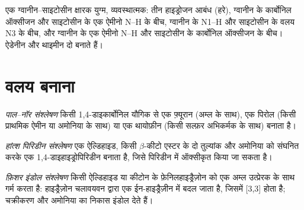\begin{omfigure}

{\small एक ग्वानीन--साइटोसीन क्षारक युग्म, व्यवस्थात्मक: तीन हाइड्रोजन आबंध (हरे),
ग्वानीन के कार्बोनिल ऑक्सीजन और साइटोसीन के एक ऐमीनो N--H के बीच, ग्वानीन के N1--H
और साइटोसीन के वलय N3 के बीच, और ग्वानीन के एक ऐमीनो N--H और साइटोसीन के
कार्बोनिल ऑक्सीजन के बीच। ऐडेनीन और थाइमीन दो बनाते हैं।}
\end{omfigure}

\section{वलय बनाना}

\begin{definition}[पाल--नॉर संश्लेषण]\label{def:b3:heterocycles:paal-knorr}
\emph{पाल--नॉर संश्लेषण} किसी 1,4-डाइकार्बोनिल यौगिक से
एक फ़्यूरान (अम्ल के साथ), एक पिरोल (किसी प्राथमिक ऐमीन या अमोनिया के साथ) या एक
थायोफ़ीन (किसी सल्फ़र अभिकर्मक के साथ) बनाता है।
\end{definition}

\begin{definition}[हांत्श पिरिडीन संश्लेषण]\label{def:b3:heterocycles:hantzsch}
\emph{हांत्श पिरिडीन संश्लेषण} एक ऐल्डिहाइड, किसी
$\beta$-कीटो एस्टर के दो तुल्यांक और अमोनिया को संघनित करके एक
1,4-डाइहाइड्रोपिरिडीन बनाता है, जिसे पिरिडीन में ऑक्सीकृत किया जा सकता है।
\end{definition}

\begin{definition}[फ़िशर इंडोल संश्लेषण]\label{def:b3:heterocycles:fischer-indole}
\emph{फ़िशर इंडोल संश्लेषण} किसी ऐल्डिहाइड या कीटोन के
फ़ेनिलहाइड्रैज़ोन को एक अम्ल उत्प्रेरक के साथ गर्म करता है: हाइड्रैज़ोन चलावयवन द्वारा
एक ईन-हाइड्रैज़ीन में बदल जाता है, जिसमें [3,3]  होता है; चक्रीकरण और अमोनिया का निकास इंडोल देते हैं।
\end{definition}

